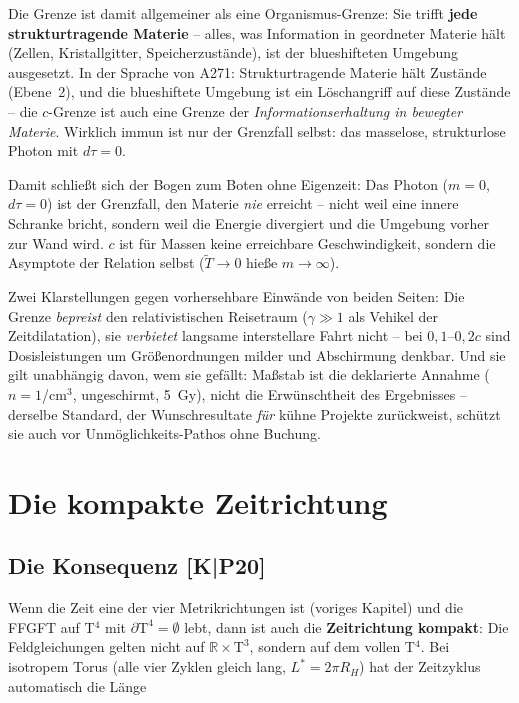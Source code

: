 \documentclass[11pt]{report}
\begin{document}
Die Grenze ist damit allgemeiner als eine Organismus-Grenze: Sie
trifft \textbf{jede strukturtragende Materie} -- alles, was
Information in geordneter Materie hält (Zellen, Kristallgitter,
Speicherzustände), ist der blueshifteten Umgebung ausgesetzt. In
der Sprache von A271: Strukturtragende Materie hält Zustände
(Ebene~2), und die blueshiftete Umgebung ist ein Löschangriff auf
diese Zustände -- die $c$-Grenze ist auch eine Grenze der
\emph{Informationserhaltung in bewegter Materie}. Wirklich immun
ist nur der Grenzfall selbst: das masselose, strukturlose Photon
mit $d\tau = 0$.

Damit schließt sich der Bogen zum Boten ohne Eigenzeit: Das Photon
($m = 0$, $d\tau = 0$) ist der Grenzfall, den Materie \emph{nie}
erreicht -- nicht weil eine innere Schranke bricht, sondern weil
die Energie divergiert und die Umgebung vorher zur Wand wird. $c$
ist für Massen keine erreichbare Geschwindigkeit, sondern die
Asymptote der Relation selbst ($\tilde T \to 0$ hieße
$m \to \infty$).

Zwei Klarstellungen gegen vorhersehbare Einwände von beiden Seiten:
Die Grenze \emph{bepreist} den relativistischen Reisetraum
($\gamma \gg 1$ als Vehikel der Zeitdilatation), sie
\emph{verbietet} langsame interstellare Fahrt nicht -- bei
$0{,}1$--$0{,}2c$ sind Dosisleistungen um Größenordnungen milder
und Abschirmung denkbar. Und sie gilt unabhängig davon, wem sie
gefällt: Maßstab ist die deklarierte Annahme
($n = 1$/cm$^3$, ungeschirmt, 5~Gy), nicht die Erwünschtheit des
Ergebnisses -- derselbe Standard, der Wunschresultate \emph{für}
kühne Projekte zurückweist, schützt sie auch vor
Unmöglichkeits-Pathos ohne Buchung.

\chapter{Die kompakte Zeitrichtung}

\section{Die Konsequenz [K|P20]}

Wenn die Zeit eine der vier Metrikrichtungen ist (voriges Kapitel)
und die FFGFT auf T$^4$ mit $\partial\text{T}^4 = \emptyset$ lebt,
dann ist auch die \textbf{Zeitrichtung kompakt}: Die Feldgleichungen
gelten nicht auf $\mathbb{R}\times\text{T}^3$, sondern auf dem
vollen T$^4$. Bei isotropem Torus (alle vier Zyklen gleich lang,
$L^{*} = 2\pi R_H$) hat der Zeitzyklus automatisch die Länge
\end{document}
